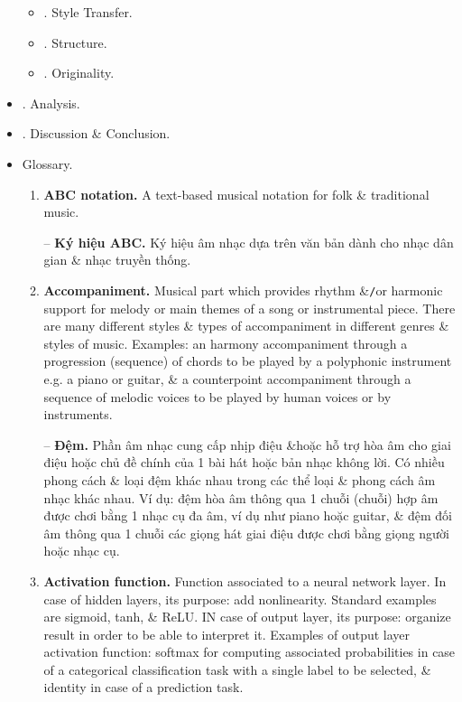 \documentclass{article}
\begin{document}
\begin{itemize}
\begin{itemize}
\begin{itemize}
		\end{itemize}
		\item {. Style Transfer.}
		\item {. Structure.}
		\item {. Originality.}
	\end{itemize}
	\item {. Analysis.}
	\item {. Discussion \& Conclusion.}
	\item {\sf Glossary.}
	\begin{enumerate}
		\item {\bf ABC notation.} A text-based musical notation for folk \& traditional music.
		
		-- {\bf Ký hiệu ABC.} Ký hiệu âm nhạc dựa trên văn bản dành cho nhạc dân gian \& nhạc truyền thống.
		\item {\bf Accompaniment.} Musical part which provides rhythm \&{\tt/}or harmonic support for melody or main themes of a song or instrumental piece. There are many different styles \& types of accompaniment in different genres \& styles of music. Examples: an harmony accompaniment through a progression (sequence) of chords to be played by a polyphonic instrument e.g. a piano or guitar, \& a counterpoint accompaniment through a sequence of melodic voices to be played by human voices or by instruments.
		
		-- {\bf Đệm.} Phần âm nhạc cung cấp nhịp điệu \&{\tt}hoặc hỗ trợ hòa âm cho giai điệu hoặc chủ đề chính của 1 bài hát hoặc bản nhạc không lời. Có nhiều phong cách \& loại đệm khác nhau trong các thể loại \& phong cách âm nhạc khác nhau. Ví dụ: đệm hòa âm thông qua 1 chuỗi (chuỗi) hợp âm được chơi bằng 1 nhạc cụ đa âm, ví dụ như piano hoặc guitar, \& đệm đối âm thông qua 1 chuỗi các giọng hát giai điệu được chơi bằng giọng người hoặc nhạc cụ.
		\item {\bf Activation function.} Function associated to a neural network layer. In case of hidden layers, its purpose: add nonlinearity. Standard examples are sigmoid, tanh, \& ReLU. IN case of output layer, its purpose: organize result in order to be able to interpret it. Examples of output layer activation function: softmax for computing associated probabilities in case of a categorical classification task with a single label to be selected, \& identity in case of a prediction task.
		

\end{enumerate}
\end{itemize}
\end{document}
